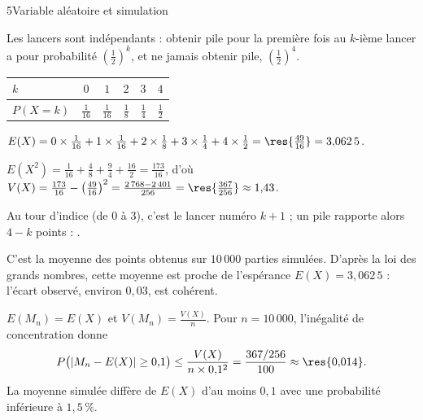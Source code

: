 

\begin{corrigeBac}{5}{Variable aléatoire et simulation}
\begin{questions}
  \item Les lancers sont indépendants : obtenir pile pour la première fois au $k$-ième lancer a pour probabilité
    $\left(\frac12\right)^{k}$, et ne jamais obtenir pile, $\left(\frac12\right)^{4}$.
\begin{center}
{\renewcommand{\arraystretch}{1.35}%
\begin{tabular}{@{}lccccc@{}}
\toprule
$k$ & $0$ & $1$ & $2$ & $3$ & $4$ \\
\midrule
$P(X=k)$ & $\frac1{16}$ & $\frac1{16}$ & $\frac18$ & $\frac14$ & $\frac12$ \\
\bottomrule
\end{tabular}}
\end{center}
  \item $E(X)=0\times\frac1{16}+1\times\frac1{16}+2\times\frac18+3\times\frac14+4\times\frac12=\res{\tfrac{49}{16}}=3{,}062\,5$. 
  \item $E(X^{2})=\frac1{16}+\frac48+\frac94+\frac{16}{2}=\frac{173}{16}$, d'où
    $V(X)=\frac{173}{16}-\left(\frac{49}{16}\right)^{2}=\frac{2\,768-2\,401}{256}=\res{\tfrac{367}{256}}\approx1{,}43$. 
\end{questions}
\begin{questions}[resume]
  \item Au tour d'indice  (de $0$ à $3$), c'est le lancer numéro $k+1$ ; un pile rapporte alors $4-k$ points : . 
  \item C'est la moyenne des points obtenus sur $10\,000$ parties simulées. D'après la loi des grands nombres, cette moyenne est proche
    de l'espérance $E(X)=3{,}062\,5$ : l'écart observé, environ $0{,}03$, est cohérent. 
  \item $E(M_n)=E(X)$ et $V(M_n)=\frac{V(X)}{n}$. Pour $n=10\,000$, l'inégalité de concentration donne
    \[P\big(|M_n-E(X)|\geq0{,}1\big)\leq\frac{V(X)}{n\times0{,}1^{2}}=\frac{367/256}{100}\approx\res{0{,}014}.\]
    La moyenne simulée diffère de $E(X)$ d'au moins $0{,}1$ avec une probabilité inférieure à $1{,}5\,\%$. \pts{1 pt}
\end{questions}
\end{corrigeBac}

